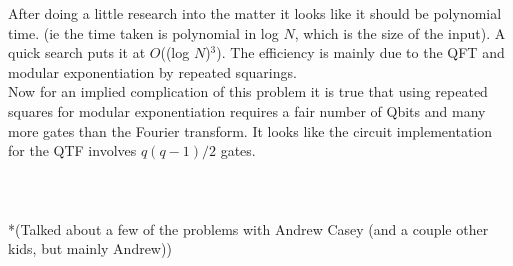After doing a little research into the matter it looks like it should be
polynomial time. (ie the time taken is polynomial in log $N$, which is the
size of the input). A quick search puts it at $O$((log $N$)$^3$). The
efficiency is mainly due to the QFT and modular exponentiation by repeated
squarings.\\

Now for an implied complication of this problem it is true that using
repeated squares for modular exponentiation requires a fair number of Qbits and
many more gates than the Fourier transform. It looks like the circuit
implementation for the QTF involves $q(q-1)/2$ gates.\\\\\\\\




*(Talked about a few of the problems with Andrew Casey (and a couple other
kids, but mainly Andrew))







